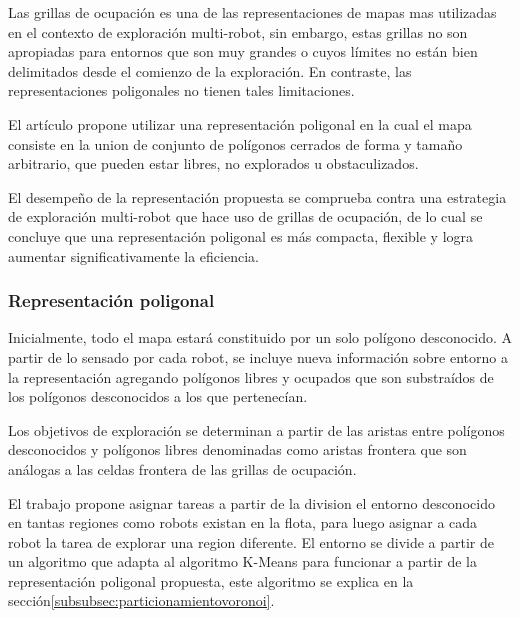 Las grillas de ocupación es una de las representaciones de mapas mas utilizadas en el contexto de exploración multi-robot, sin embargo, estas grillas no son apropiadas para entornos que son muy grandes o cuyos límites no están bien delimitados desde el comienzo de la exploración. En contraste, las representaciones poligonales no tienen tales limitaciones.

El artículo propone utilizar una representación poligonal en la cual el mapa consiste en la union de conjunto de polígonos cerrados de forma y tamaño arbitrario, que pueden estar libres, no explorados u obstaculizados. 

El desempeño de la representación propuesta se comprueba contra una estrategia de exploración multi-robot que hace uso de grillas de ocupación, de lo cual se concluye que una representación poligonal es más compacta, flexible y logra aumentar significativamente la eficiencia.

\subsubsection{Representación poligonal}
Inicialmente, todo el mapa estará constituido por un solo polígono desconocido. A partir de lo sensado por cada robot, se incluye nueva información sobre entorno a la representación agregando polígonos libres y ocupados que son substraídos de los polígonos desconocidos a los que pertenecían.

Los objetivos de exploración se determinan a partir de las aristas entre polígonos desconocidos y polígonos libres denominadas como aristas frontera que son análogas a las celdas frontera de las grillas de ocupación.

El trabajo propone asignar tareas a partir de la division el entorno desconocido en tantas regiones como robots existan en la flota, para luego asignar a cada robot la tarea de explorar una region diferente. El entorno se divide a partir de un algoritmo que adapta al algoritmo K-Means para funcionar a partir de la representación poligonal propuesta, este algoritmo se explica en la sección\ref{subsubsec:particionamientovoronoi}.

